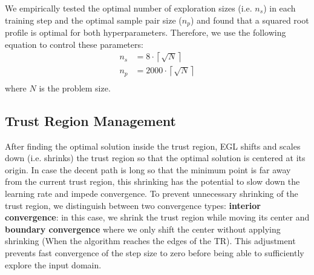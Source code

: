 We empirically tested the optimal number of exploration sizes (i.e. $n_s$) in each training step and the optimal sample pair size ($n_p$) and found that a squared root profile is optimal for both hyperparameters. Therefore, we use the following equation to control these parameters:
\begin{equation}
    \begin{aligned}
        n_s & = 8 \cdot \left\lceil \sqrt{N} \right\rceil \\
        n_p & = 2000 \cdot \left\lceil \sqrt{N} \right\rceil \\
    \end{aligned}
\end{equation}
where $N$ is the problem size.


\subsection{Trust Region Management}
\label{tr_management}
After finding the optimal solution inside the trust region, EGL shifts and scales down (i.e. shrinks) the trust region so that the optimal solution is centered at its origin. In case the decent path is long so that the minimum point is far away from the current trust region, this shrinking has the potential to slow down the learning rate and impede convergence.
To prevent unnecessary shrinking of the trust region, we distinguish between two convergence types: \textbf{interior convergence}: in this case, we shrink the trust region while moving its center and \textbf{boundary convergence} where we only shift the center without applying shrinking (When the algorithm reaches the edges of the TR). This adjustment prevents fast convergence of the step size to zero before being able to sufficiently explore the input domain. 


